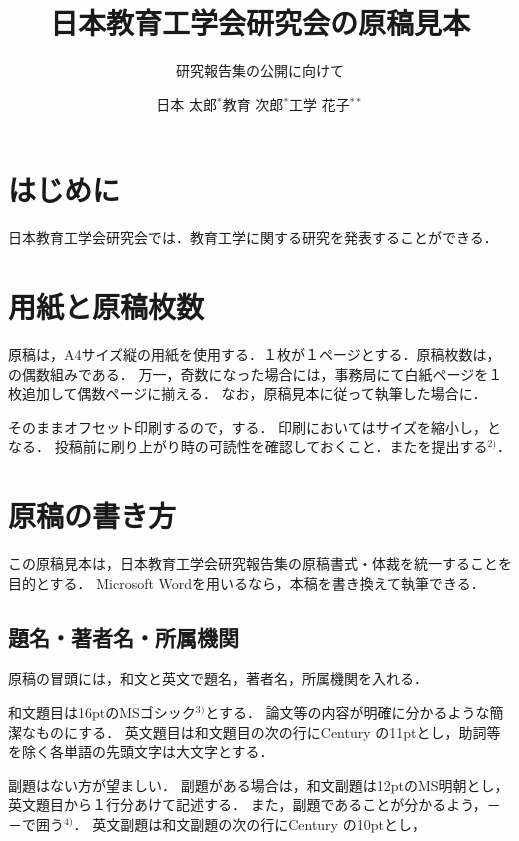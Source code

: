 \documentclass[dvipdfmx]{jset-study-group}
\title{日本教育工学会研究会の原稿見本}
\subtitle{研究報告集の公開に向けて}
\author{日本 太郎$^\ast$\hspace{1cm}教育 次郎$^\ast$\hspace{1cm}工学 花子$^{\ast\ast}$}
\affiliation{日本教育大学工学部$^\ast$\hspace{5mm}日本教育大学教育学部$^{\ast\ast}$}
\begin{document}

\maketitle

\section{はじめに}

日本教育工学会研究会では．教育工学に関する研究を発表することができる．

\section{用紙と原稿枚数}

原稿は，A4サイズ縦の用紙を使用する．１枚が１ページとする．原稿枚数は，の偶数組みである．
万一，奇数になった場合には，事務局にて白紙ページを１枚追加して偶数ページに揃える．
なお，原稿見本に従って執筆した場合に．

そのままオフセット印刷するので，する．
印刷においてはサイズを縮小し，となる．
投稿前に刷り上がり時の可読性を確認しておくこと．またを提出する$^{2)}$．

\section{原稿の書き方}

この原稿見本は，日本教育工学会研究報告集の原稿書式・体裁を統一することを目的とする．
Microsoft Wordを用いるなら，本稿を書き換えて執筆できる．

\subsection{題名・著者名・所属機関}

原稿の冒頭には，和文と英文で題名，著者名，所属機関を入れる．

和文題目は16ptのMSゴシック$^{3)}$とする．
論文等の内容が明確に分かるような簡潔なものにする．
英文題目は和文題目の次の行にCentury の11ptとし，助詞等を除く各単語の先頭文字は大文字とする．

副題はない方が望ましい．
副題がある場合は，和文副題は12ptのMS明朝とし，英文題目から１行分あけて記述する．
また，副題であることが分かるよう，－　－で囲う$^{4)}$．
英文副題は和文副題の次の行にCentury の10ptとし，
\end{document}
